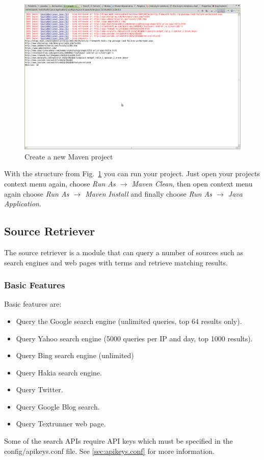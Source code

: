 \documentclass[a4paper,twoside]{article}      %
\begin{document}
\begin{figure}
\includegraphics[width=\textwidth]{img/ht14.png}
\caption{Create a new Maven project}
\label{fig:structure}
\end{figure}
With the structure from Fig.~\ref{fig:structure} you can run your project. Just open your projects context menu again, choose \textit{Run As $\rightarrow$ Maven Clean}, then open context menu again choose \textit{Run As $\rightarrow$ Maven Install} and finally choose \textit{Run As $\rightarrow$ Java Application}.

\subsection{Source Retriever}
The source retriever is a module that can query a number of sources such as search engines and web pages with terms and retrieve matching results.
\subsubsection{Basic Features}
Basic features are:
\begin{itemize}
\item Query the Google search engine (unlimited queries, top 64 results only).
\item Query Yahoo search engine (5000 queries per IP and day, top 1000 results).
\item Query Bing search engine (unlimited)
\item Query Hakia search engine.
\item Query Twitter.
\item Query Google Blog search.
\item Query Textrunner web page.
\end{itemize}
Some of the search APIs require API keys which must be specified in the config/apikeys.conf file. See \ref{sec:apikeys.conf} for more information.
\end{document}
